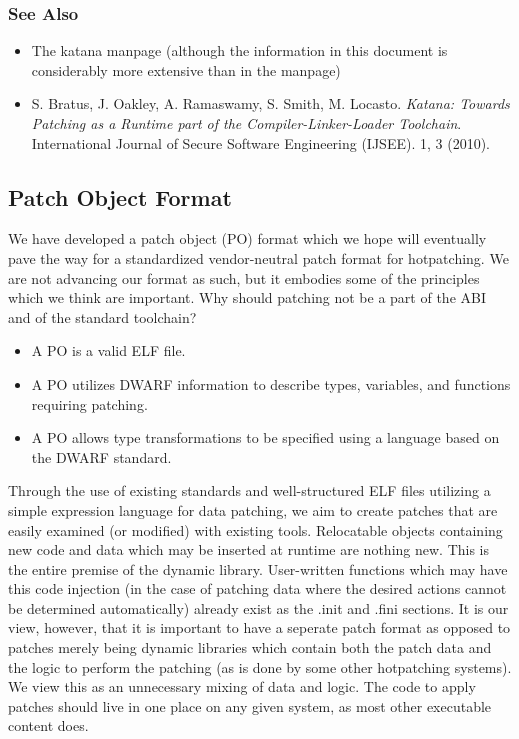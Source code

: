 \documentclass[11pt]{article}
\begin{document}
\subsubsection{See Also}
\label{sec-3.5.9}

\begin{itemize}
\item The katana manpage (although the information in this document is
      considerably more extensive than in the manpage)
\item S. Bratus, J. Oakley, A. Ramaswamy, S. Smith,
      M. Locasto. \emph{Katana: Towards Patching as a Runtime part of the       Compiler-Linker-Loader Toolchain}. International Journal of
      Secure Software Engineering (IJSEE). 1, 3 (2010).
\end{itemize}
\subsection{Patch Object Format}
\label{sec-3.6}

   We have developed a patch object (PO) format which we hope will
   eventually pave the way for a standardized vendor-neutral patch
   format for hotpatching. We are not advancing our format as such,
   but it embodies some of the principles which we think are
   important. Why should patching not be a part of the ABI and of the
   standard toolchain?
\begin{itemize}
\item A PO is a valid ELF file.
\item A PO utilizes DWARF information to describe types, variables, and
     functions requiring patching.
\item A PO allows type transformations to be specified using a language
     based on the DWARF standard.
\end{itemize}
   Through the use of existing standards and well-structured ELF files
   utilizing a simple expression language for data patching, we aim to
   create patches that are easily examined (or modified) with existing
   tools. Relocatable objects containing new code and data which may
   be inserted at runtime are nothing new. This is the entire premise
   of the dynamic library. User-written functions which may have this
   code injection (in the case of patching data where the desired
   actions cannot be determined automatically) already exist as the
   .init and .fini sections. It is our view, however, that it is
   important to have a seperate patch format as opposed to patches
   merely being dynamic libraries which contain both the patch data
   and the logic to perform the patching (as is done by some other
   hotpatching systems). We view this as an unnecessary mixing of data
   and logic. The code to apply patches should live in one place on
   any given system, as most other executable content does.
\end{document}

